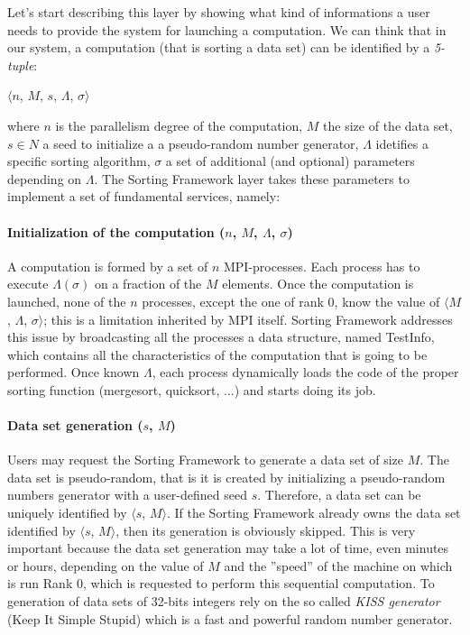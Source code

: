 \label{sort-fram}
Let's start describing this layer by showing what kind of informations a user needs to provide the system for launching a computation. We can think that in our system, a computation (that is sorting a data set) can be identified by a \textit{5-tuple}:
\begin{center}
$\langle n$, $M$, $s$, $\Lambda$, $\sigma \rangle$
\end{center} 
where $n$ is the parallelism degree of the computation, $M$ the size of the data set, $s \in N$ a seed to initialize a a pseudo-random number generator, $\Lambda$ idetifies a specific sorting algorithm, $\sigma$ a set of additional (and optional) parameters depending on $\Lambda$.
The Sorting Framework layer takes these parameters to implement a set of fundamental services, namely: 

\paragraph{Initialization of the computation ($n$, $M$, $\Lambda$, $\sigma$)} A computation is formed by a set of $n$ MPI-processes. Each process has to execute $\Lambda(\sigma)$ on a fraction of the $M$ elements. Once the computation is launched, none of the $n$ processes, except the one of rank $0$, know the value of $\langle M$, $\Lambda$, $\sigma \rangle$; this is a limitation inherited by MPI itself. Sorting Framework addresses this issue by broadcasting all the processes a data structure, named TestInfo, which contains all the characteristics of the computation that is going to be performed. Once known $\Lambda$, each process dynamically loads the code of the proper sorting function (mergesort, quicksort, ...) and starts doing its job.  

\paragraph{Data set generation ($s$, $M$)} Users may request the Sorting Framework to generate a data set of size $M$. The data set is pseudo-random, that is it is created by initializing a pseudo-random numbers generator with a user-defined seed $s$. Therefore, a data set can be uniquely identified by $\langle s$, $M \rangle$. If the Sorting Framework already owns the data set identified by $\langle s$, $M \rangle$, then its generation is obviously skipped. This is very important because the data set generation may take a lot of time, even minutes or hours, depending on the value of $M$ and the ''speed'' of the machine on which is run Rank $0$, which is requested to perform this sequential computation. To generation of data sets of 32-bits integers rely on the so called \textit{KISS generator} (Keep It Simple Stupid) which is a fast and powerful random number generator.

